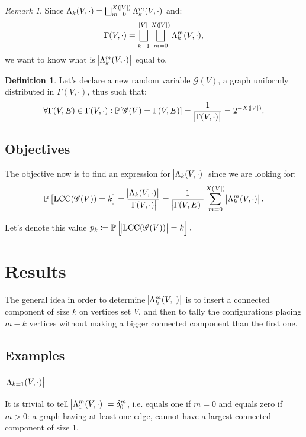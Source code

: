 \documentclass{article}
\theoremstyle{definition}
\newtheorem{definition}[lemma]{Definition}
\theoremstyle{remark}
\newtheorem*{remark}{Remark}
\DeclareMathOperator{\LCC}{LCC}
\renewcommand{\P}{\mathbb P}
\begin{document}
		\begin{remark} Since $\Lambda_k(V, \cdot) = \bigsqcup_{m=0}^{X(\abs V)}\Lambda_k^m(V, \cdot)$ and:
		\[\Gamma(V, \cdot) = \bigsqcup_{k=1}^{\abs V}\bigsqcup_{m=0}^{X(\abs V)}\Lambda_k^m(V, \cdot),\]
		we want to know what is $\abs {\Lambda_k^m(V, \cdot)}$ equal to.
		\end{remark}

		\begin{definition} Let's declare a new random variable $\mathscr G(V)$, a graph uniformly distributed in $\Gamma(V, \cdot)$, thus such that:
		\[\forall \Gamma(V, E) \in \Gamma(V, \cdot) : \P[\mathscr G(V) = \Gamma(V, E)] = \frac 1{\abs {\Gamma(V, \cdot)}} = 2^{-X(\abs V)}.\]
		\end{definition}

	\subsection{Objectives}
		The objective now is to find an expression for $\abs {\Lambda_k(V, \cdot)}$ since we are looking for:
		\[\P\left[\LCC(\mathscr G(V)) = k\right] = \frac {\abs {\Lambda_k(V, \cdot)}}{\abs {\Gamma(V, \cdot)}}
			= \frac 1{\abs {\Gamma(V, E)}}\sum_{m=0}^{X(\abs V)}\abs {\Lambda_k^m(V, \cdot)}.\]

		Let's denote this value $p_k \coloneqq \P\left[\abs {\LCC(\mathscr G(V))} = k\right].$

\section{Results}\label{sec:results}
	The general idea in order to determine $\abs {\Lambda_k^m(V, \cdot)}$ is to insert a connected component of size $k$ on vertices set $V$, and then to tally the configurations
	placing $m-k$ vertices without making a bigger connected component than the first one.

	\subsection{Examples}
		\subsubsection{$\abs {\Lambda_{k=1}(V, \cdot)}$}
			It is trivial to tell $\abs {\Lambda_1^m(V, \cdot)} = \delta_0^m$, i.e. equals one if $m=0$ and equals zero if $m>0$: a graph having at least one edge, cannot have
			a largest connected component of size 1.
\end{document}
